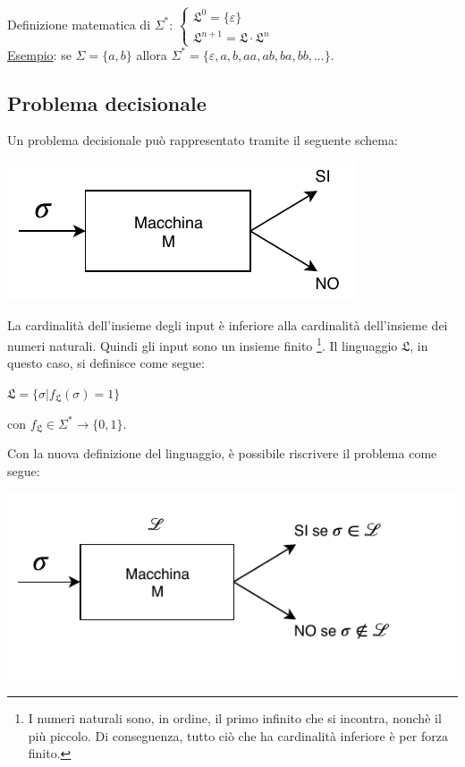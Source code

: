 \documentclass[a4paper, 10pt]{report}
\begin{document}
\begin{tcolorbox}
Definizione matematica di $\Sigma^*$:
$\begin{cases} 
\mathfrak{L}^0 = \{ \varepsilon\} \\
\mathfrak{L}^{n+1} = \mathfrak{L} \cdot \mathfrak{L}^n
\end{cases} $\\

\underline{Esempio}: se $\Sigma = \{a, b \}$ allora $\Sigma^* = \{\varepsilon, a, b, aa, ab, ba, bb, ... \}$.
\end{tcolorbox}

\subsection*{Problema decisionale}
Un problema decisionale può rappresentato tramite il seguente schema:

\begin{center}
\includegraphics[scale=0.85]{immagine1.pdf}
\end{center}

\noindent La cardinalità dell'insieme degli input è inferiore alla cardinalità dell'insieme dei numeri naturali. Quindi gli input sono un insieme finito \footnote{I numeri naturali sono, in ordine, il primo infinito che si incontra, nonchè il più piccolo. Di conseguenza, tutto ciò che ha cardinalità inferiore è per forza finito.}.
Il linguaggio $\mathfrak{L}$, in questo caso, si definisce come segue:
\begin{center}
$\mathfrak{L} = \{\sigma | f_\mathfrak{L}(\sigma) = 1 \}$
\end{center}

\noindent con $f_\mathfrak{L} \in \Sigma^* \rightarrow \{0, 1 \}$.

\noindent Con la nuova definizione del linguaggio, è possibile riscrivere il problema come segue:

\begin{center}
\includegraphics[scale=0.85]{immagine2.pdf}
\end{center}
\end{document}

